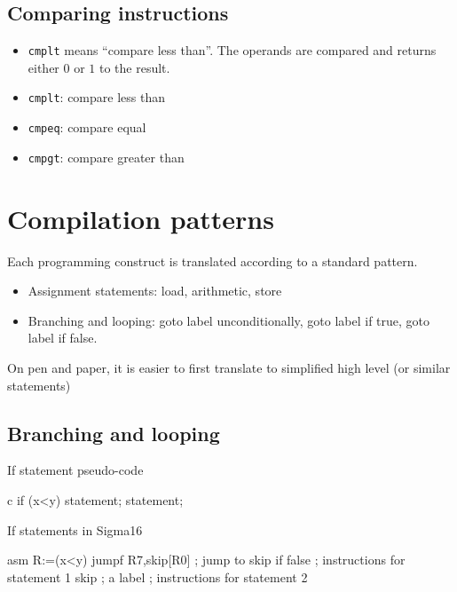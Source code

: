 \subsection{Comparing instructions}\label{sub:comparing_instructions}

\begin{itemize}
	\item \texttt{cmplt} means ``compare less than''.
	      The operands are compared and returns either \(0\) or \(1\) to the result.
	\item \texttt{cmplt}: compare less than
	\item \texttt{cmpeq}: compare equal
	\item \texttt{cmpgt}: compare greater than
\end{itemize}

\section{Compilation patterns}\label{sec:compilation_patterns}

Each programming construct is translated according to a standard pattern.

\begin{itemize}
	\item Assignment statements: load, arithmetic, store
	\item Branching and looping: goto label unconditionally, goto label if true, goto label if false.
\end{itemize}
On pen and paper, it is easier to first translate to simplified high level (or similar statements)

\subsection{Branching and looping}\label{sub:branching_and_looping}

\begin{highlight}{If statement pseudo-code}
	\begin{code}{c}
		if (x<y) {
			statement;
		}
		statement;
	\end{code}
\end{highlight}

\begin{highlight}{If statements in Sigma16}
	\begin{code}{asm}
		R:=(x<y)
		jumpf R7,skip[R0] ; jump to skip if false
		; instructions for statement 1
		skip ; a label
		; instructions for statement 2
	\end{code}
\end{highlight}

